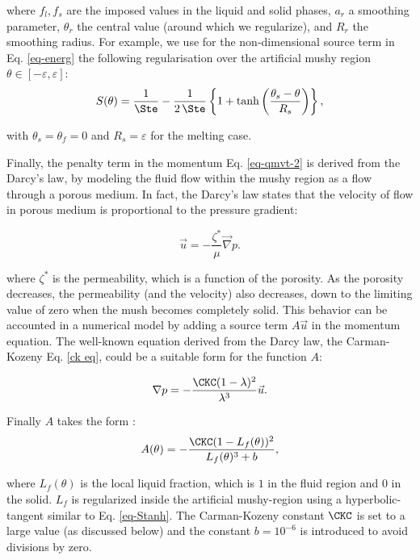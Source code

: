 \noindent where $f_l, f_s$ are the imposed values in the liquid and solid phases, $a_r$ a smoothing  parameter, $\theta_r$ the central value (around which we regularize), and $R_r$ the smoothing radius. For example, we use for the non-dimensional source term in Eq. \ref{eq-energ} the following regularisation over the artificial mushy region $\theta \in [-\varepsilon, \varepsilon]$:
\begin{equation}
S(\theta) = \frac{1}{\Ste} - \frac{1}{2\,\Ste}\left\{
1 + \tanh\left(\frac{\theta_s-\theta}{R_s}\right)
\right\},
\label{eq-Stanh}
\end{equation} 

\noindent with $\theta_s=\theta_f=0$ and $R_s=\varepsilon$ for the melting case. 

Finally, the penalty term in the momentum Eq. \ref{eq-qmvt-2} is derived from the Darcy's law, by modeling the fluid flow within the mushy region as a flow through a porous medium.
In fact, the Darcy's law states that the velocity of flow in porous medium is proportional to the pressure gradient:

\begin{equation}
	\vec u = - \frac{\zeta^*}{\mu} \vec \nabla p.
\end{equation}

\noindent where $\zeta^*$ is the permeability, which is a function of the porosity.
As the porosity decreases, the permeability (and the velocity) also decreases, down to the limiting value of zero when the mush becomes completely solid.
This behavior can be accounted in a numerical model by adding a source term $A \vec u$ in the momentum equation.
The well-known equation derived from the Darcy law, the Carman-Kozeny Eq. \ref{ck eq}, could be a suitable form for the function $A$:

\begin{equation} \label{ck eq}
	\nabla p = - \frac{\CKC (1 - \lambda)^2}{\lambda^3} \vec u.
\end{equation}

\noindent Finally $A$ takes the form \citep{Belhamadia2012,kheirabadi2015effect}:
\begin{equation}\label{eq-CK}
A(\theta) = -\frac{\CKC (1 - L_f(\theta))^2}{L_f(\theta)^3 + b}, 
\end{equation}

\noindent where $L_f(\theta)$ is the local liquid fraction, which is  $1$ in the fluid region and  $0$ in the solid. $L_f$ is regularized inside the artificial  mushy-region using a hyperbolic-tangent similar to Eq. \ref{eq-Stanh}.
The Carman-Kozeny constant $\CKC$ is set to a  large value (as discussed below) and  the constant $b=10^{-6}$ is introduced to avoid divisions by zero.

